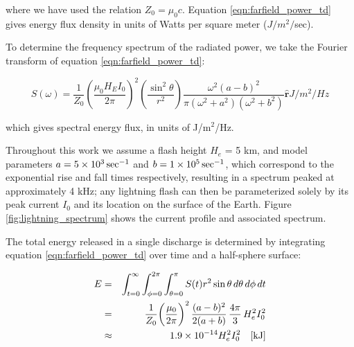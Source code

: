 where we have used the relation $Z_0 = \mu_0 c$. Equation \eqref{eqn:farfield_power_td} gives energy flux density in units of Watts per square meter ($J/m^2/$sec).

To determine the frequency spectrum of the radiated power, we take the Fourier transform of equation \eqref{eqn:farfield_power_td}:

\begin{equation}
\label{eqn:farfield_power_fd}
S(\omega) = \frac{1}{Z_0}\left(\frac{\mu_0 H_E I_0}{2 \pi}\right)^2\left(\frac{\sin^2\theta}{r^2}\right) \frac{\omega^2(a-b)^2}{\pi(\omega^2 + a^2)(\omega^2 + b^2)}  \mathbf{\hat{r}}
\unit{J/m^2/Hz}
\end{equation}

which gives spectral energy flux, in units of J/m$^2$/Hz.

Throughout this work we assume a flash height $H_e$ = 5 km, and model parameters $a=5\times 10^{3}\,\mathrm{sec}^{-1}$ and $b=1\times 10^{5}\,\mathrm{sec}^{-1}$, which correspond to the exponential rise and fall times respectively, resulting in a spectrum peaked at approximately 4 kHz; any lightning flash can then be parameterized solely by its peak current $I_0$ and its location on the surface of the Earth. Figure \ref{fig:lightning_spectrum} shows the current profile and associated spectrum.

The total energy released in a single discharge is determined by integrating equation \ref{eqn:farfield_power_td} over time and a half-sphere surface:

\begin{eqnarray}
\label{eqn:total_energy_below_iono}
E &= &\int_{t=0}^\infty \int_{\phi=0}^{2\pi} \int_{\theta=0}^\pi  S(t) r^2 \sin\theta\,d\theta\,d\phi\,dt \\
 & = & \frac{1}{Z_0}\bigg(\frac{\mu_0}{2\pi}\bigg)^2 \, \frac{(a - b)^2}{2 (a + b)}  \, \frac{4 \pi}{3} \, H_e^2 I_0^2 \\
 & \approx & 1.9\times 10^{-14}H_e^2 I_0^2 \quad[\mathrm{kJ}]
\end{eqnarray}

